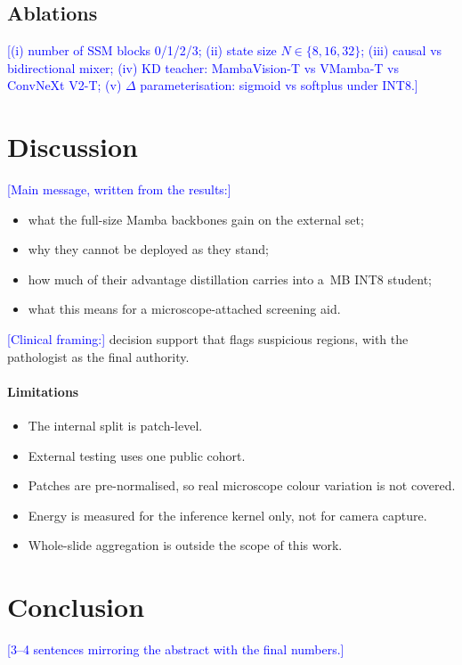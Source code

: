 \documentclass[preprint,12pt]{elsarticle}
\newcommand{\todo}[1]{\textcolor{blue}{[#1]}}
\begin{document}
\subsection{Ablations}
\todo{(i) number of SSM blocks 0/1/2/3; (ii) state size $N\in\{8,16,32\}$; (iii) causal vs bidirectional mixer; (iv) KD teacher: MambaVision-T vs VMamba-T vs ConvNeXt V2-T; (v) $\Delta$ parameterisation: sigmoid vs softplus under INT8.}

\section{Discussion}
\todo{Main message, written from the results:}
\begin{itemize}
\item what the full-size Mamba backbones gain on the external set;
\item why they cannot be deployed as they stand;
\item how much of their advantage distillation carries into a \resStudentIntEightMB\,MB INT8 student;
\item what this means for a microscope-attached screening aid.
\end{itemize}
\todo{Clinical framing:} decision support that flags suspicious regions, with the pathologist as the final authority.

\paragraph{Limitations}
\begin{itemize}
\item The internal split is patch-level.
\item External testing uses one public cohort.
\item Patches are pre-normalised, so real microscope colour variation is not covered.
\item Energy is measured for the inference kernel only, not for camera capture.
\item Whole-slide aggregation is outside the scope of this work.
\end{itemize}

\section{Conclusion}
\todo{3--4 sentences mirroring the abstract with the final numbers.}
\end{document}

